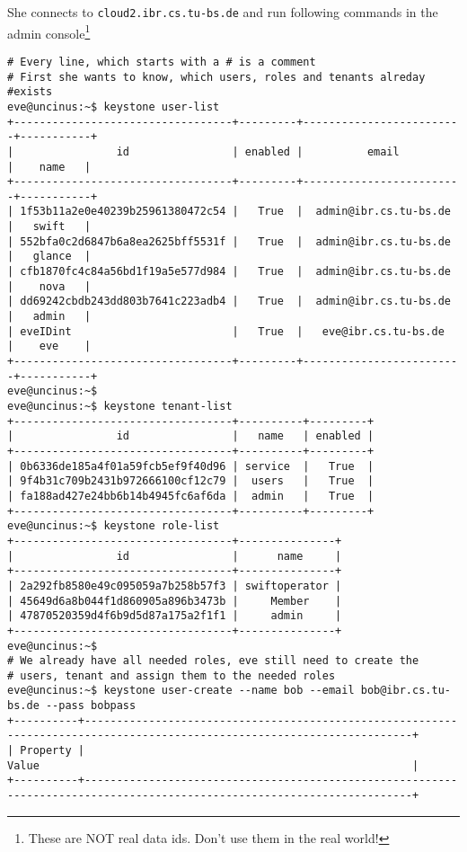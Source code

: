 \documentclass[a4paper,ngerman,bibtotocliststotoc]{scrartcl}
\begin{document}
She connects to \verb|cloud2.ibr.cs.tu-bs.de| and run following
commands in the admin console\footnote{These are NOT real data
  ids. Don't use them in the real world!}
\begin{verbatim}
# Every line, which starts with a # is a comment
# First she wants to know, which users, roles and tenants alreday
#exists
eve@uncinus:~$ keystone user-list
+----------------------------------+---------+-------------------------+-----------+
|                id                | enabled |          email          |    name   |
+----------------------------------+---------+-------------------------+-----------+
| 1f53b11a2e0e40239b25961380472c54 |   True  |  admin@ibr.cs.tu-bs.de  |   swift   |
| 552bfa0c2d6847b6a8ea2625bff5531f |   True  |  admin@ibr.cs.tu-bs.de  |   glance  |
| cfb1870fc4c84a56bd1f19a5e577d984 |   True  |  admin@ibr.cs.tu-bs.de  |    nova   |
| dd69242cbdb243dd803b7641c223adb4 |   True  |  admin@ibr.cs.tu-bs.de  |   admin   |
| eveIDint                         |   True  |   eve@ibr.cs.tu-bs.de   |    eve    |
+----------------------------------+---------+-------------------------+-----------+
eve@uncinus:~$
eve@uncinus:~$ keystone tenant-list
+----------------------------------+----------+---------+
|                id                |   name   | enabled |
+----------------------------------+----------+---------+
| 0b6336de185a4f01a59fcb5ef9f40d96 | service  |   True  |
| 9f4b31c709b2431b972666100cf12c79 |  users   |   True  |
| fa188ad427e24bb6b14b4945fc6af6da |  admin   |   True  |
+----------------------------------+----------+---------+
eve@uncinus:~$ keystone role-list
+----------------------------------+---------------+
|                id                |      name     |
+----------------------------------+---------------+
| 2a292fb8580e49c095059a7b258b57f3 | swiftoperator |
| 45649d6a8b044f1d860905a896b3473b |     Member    |
| 47870520359d4f6b9d5d87a175a2f1f1 |     admin     |
+----------------------------------+---------------+
eve@uncinus:~$
# We already have all needed roles, eve still need to create the
# users, tenant and assign them to the needed roles
eve@uncinus:~$ keystone user-create --name bob --email bob@ibr.cs.tu-bs.de --pass bobpass
+----------+-------------------------------------------------------------------------------------------------------------------------+
| Property |                                                          Value                                                          |
+----------+-------------------------------------------------------------------------------------------------------------------------+

\end{verbatim}
\end{document}
